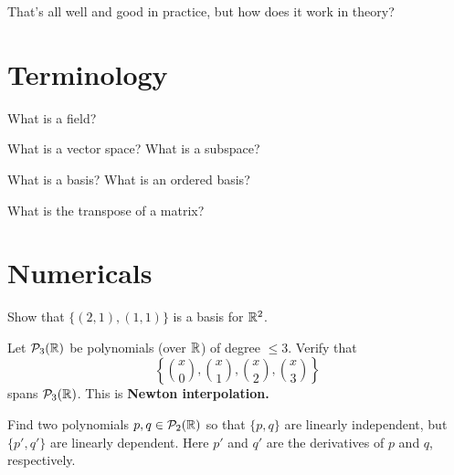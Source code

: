 \documentclass{homework}
\author{Jim Fowler}
\begin{document}
\maketitle

\begin{inspiration}
That's all well and good in practice, but how does it work in theory?
\end{inspiration}

\section{Terminology}

\begin{problem}
  What is a field?
\end{problem}

\begin{problem}
  What is a vector space?  What is a subspace?
\end{problem}

\begin{problem}
  What is a basis?  What is an ordered basis?
\end{problem}

\begin{problem} %
  What is the transpose of a matrix?
\end{problem}

\section{Numericals}


\begin{problem}
  Show that $\{ (2,1), (1,1) \}$ is a basis for $\mathbb{R}^2$.
\end{problem}

\begin{problem}
  Let $\mathcal{P}_{3}(\mathbb{R})$ be polynomials (over $\mathbb{R}$) of degree $\leq 3$.  Verify that
  \[ \left\{ \binom{x}{0}, \binom{x}{1}, \binom{x}{2}, \binom{x}{3} \right\} \]
  spans $\mathcal{P}_{3}(\mathbb{R})$.  This is \textbf{Newton interpolation.}
\end{problem}

\begin{problem}
  Find two polynomials $p,q \in \mathcal{P}_{2}(\mathbb{R})$ so that $\{p,q\}$ are linearly independent, but $\{p',q'\}$ are linearly dependent.  Here $p'$ and $q'$ are the derivatives of $p$ and $q$, respectively.
\end{problem}
\end{document}
